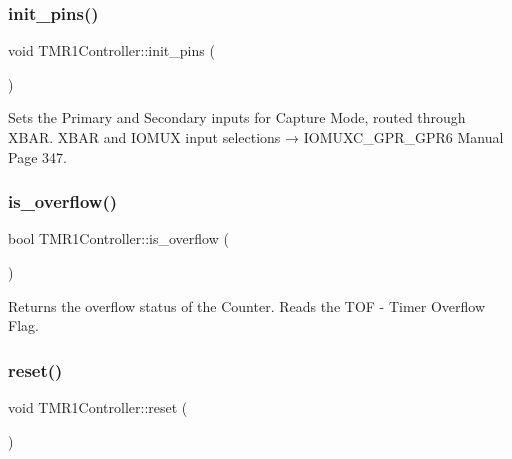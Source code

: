 \subsubsection{\texorpdfstring{init\+\_\+pins()}{init\_pins()}}
{\footnotesize\ttfamily void T\+M\+R1\+Controller\+::init\+\_\+pins (\begin{DoxyParamCaption}{ }\end{DoxyParamCaption})\hspace{0.3cm}{\ttfamily [inline]}}



Sets the Primary and Secondary inputs for Capture Mode, routed through X\+B\+AR.  X\+B\+AR and I\+O\+M\+UX input selections → I\+O\+M\+U\+X\+C\+\_\+\+G\+P\+R\+\_\+\+G\+P\+R6 Manual Page 347. 

\mbox{\label{classTMR1Controller_a06052b4a881156be3c7a4b6495d8ca11}} 
\subsubsection{\texorpdfstring{is\+\_\+overflow()}{is\_overflow()}}
{\footnotesize\ttfamily bool T\+M\+R1\+Controller\+::is\+\_\+overflow (\begin{DoxyParamCaption}{ }\end{DoxyParamCaption})\hspace{0.3cm}{\ttfamily [inline]}}



Returns the overflow status of the Counter. Reads the T\+OF -\/ Timer Overflow Flag. 

\mbox{\label{classTMR1Controller_adf3746ffd24c5b55abff4fa18e05f6b3}} 
\subsubsection{\texorpdfstring{reset()}{reset()}}
{\footnotesize\ttfamily void T\+M\+R1\+Controller\+::reset (\begin{DoxyParamCaption}{ }\end{DoxyParamCaption})\hspace{0.3cm}{\ttfamily [inline]}}



